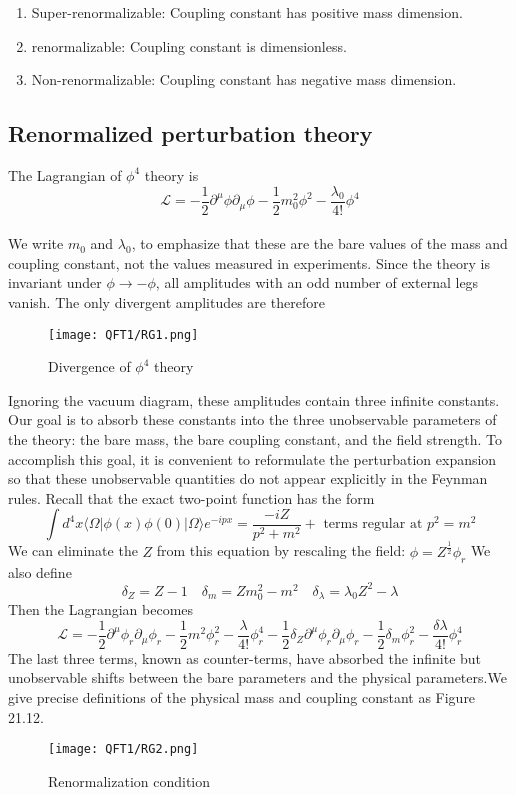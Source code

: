\documentclass[cyan]{elegantnote}
\begin{document}
\begin{enumerate}
\item Super-renormalizable: Coupling constant has positive mass dimension.
\item  renormalizable: Coupling constant is dimensionless.
\item  Non-renormalizable: Coupling constant has negative mass dimension.
\end{enumerate}

\subsection{Renormalized perturbation theory}
The Lagrangian of $\phi^4$ theory is 
\[\mathcal{L} = -\frac{1}{2} \partial^{\mu} \phi \partial_{\mu} \phi -\frac{1}{2}m_0^2 \phi^2 - \frac{\lambda_0}{4!}\phi^4\]
\\
We write $m_0$ and $\lambda_0$, to emphasize that these are the bare values of the mass and coupling constant, not the values measured in experiments.
Since the theory is invariant under $\phi \to -\phi$, all amplitudes with an odd number of external legs vanish. The only divergent amplitudes are therefore
\begin{figure}[!h]
\centering
\texttt{[image: QFT1/RG1.png]}
\caption{Divergence of $\phi^4$ theory}
\end{figure}
\noindent
Ignoring the vacuum diagram, these amplitudes contain three infinite constants. Our goal is to absorb these constants into the three unobservable parameters of the theory: the bare mass, the bare coupling constant, and the field strength. To accomplish this goal, it is convenient to reformulate the perturbation expansion so that these unobservable quantities do not appear
explicitly in the Feynman rules. Recall that the exact two-point function has the form
\[\int d^4x \langle \Omega | \phi(x) \phi(0) | \Omega \rangle e^{-ipx} = \frac{-iZ}{p^2+m^2} + \mbox{ terms regular at } p^2 = m^2\]
We can eliminate the $Z$ from this equation by rescaling the field:
$\phi = Z^{\frac{1}{2}} \phi_r$
We also define
\[\delta_Z = Z -1 \quad \delta_m = Zm_0^2 - m^2 \quad \delta_{\lambda} = \lambda_0 Z^2 - \lambda\]
Then the Lagrangian becomes
\[\mathcal{L} = -\frac{1}{2} \partial^{\mu} \phi_r \partial_{\mu} \phi_r -\frac{1}{2}m^2 \phi_r^2 - \frac{\lambda}{4!}\phi_r^4 -\frac{1}{2} \delta_Z \partial^{\mu} \phi_r \partial_{\mu} \phi_r -\frac{1}{2}\delta_m \phi_r^2 - \frac{\delta \lambda}{4!}\phi_r^4\]
The last three terms, known as counter-terms, have absorbed the infinite but unobservable shifts between the bare parameters and the physical parameters.We give precise definitions of the physical mass and coupling constant as Figure 21.12.\\
\begin{figure}[!h]
\centering
\texttt{[image: QFT1/RG2.png]}
\caption{Renormalization condition}
\end{figure}
\end{document}
